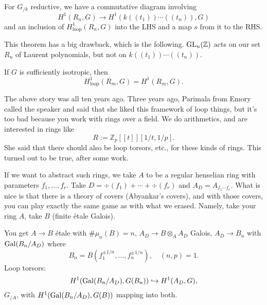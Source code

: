 \documentclass[reqno]{amsart} 
\numberwithin{theorem}{section}
\numberwithin{equation}{section}
\begin{document}
\begin{theorem}[CGP]
  For $G_{/k}$ reductive, we have a commutative diagram involving
  \begin{equation*}
    H^1(R_n, G) \rightarrow H^1(k((t_1)) \dotsb((t_n)), G)
  \end{equation*}
  and an inclusion of $H^1_{\mathrm{loop}}(R_n, G)$ into the LHS and a map $s$ from it to the RHS.
\end{theorem}

This theorem has a big drawback, which is the following.  $\operatorname{GL}_n(\mathbb{Z})$ acts on our set $R_n$ of Laurent polynomials, but not on $k((t_1)) \dotsb ((t_n))$.

\begin{theorem}[Staviova] If $G$ is sufficiently isotropic, then
  \begin{equation*}
    H^1_{\mathrm{loop}}(R_m, G) = H^1(R_m, G).
  \end{equation*}
\end{theorem}

The above story was all ten years ago.  Three years ago, Parimala from Emory called the speaker and said that she liked this framework of loop things, but it's too bad because you work with rings over a field.  We do arithmetics, and are interested in rings like
\begin{equation*}
  R := \mathbb{Z}_p[[t]][1/t, 1/p].
\end{equation*}
She said that there should also be loop torsors, etc., for these kinds of rings.  This turned out to be true, after some work.

If we want to abstract such rings, we take $A$ to be a regular henselian ring with parameters $f_1, \dotsc, f_r$.  Take $D = \div(f_1) + \dotsb + \div(f_r)$ and $A_D = A_{f_1 \dotsb f_r}$.  What is nice is that there is a theory of covers (Abyankar's covers), and with those covers, you can play exactly the same game as with what we erased.  Namely, take your ring $A$, take $B$ (finite {\'e}tale Galois).


You get $A \rightarrow B$ {\'e}tale with $\# \mu_n(B) = n$, $A_D \rightarrow B \otimes_A A_D$ Galois, $A_D \rightarrow B_n$ with $\operatorname{Gal}(B_n / A_D)$ where
\begin{equation*}
  B_n = B \left( f_1^{\pm 1 / n} , \dotsc,  f_n^{\pm 1 / n} \right), \quad
  (n, p) = 1.
\end{equation*}
Loop torsors:
\begin{equation*}
  H^1(\operatorname{Gal}(B_n / A_D), G(B_n)) \hookrightarrow H^1(A_D, G),
\end{equation*}
$G_{/A}$, with $H^1(\operatorname{Gal}(B_n / A_D), G(B))$ mapping into both.
\end{document}
